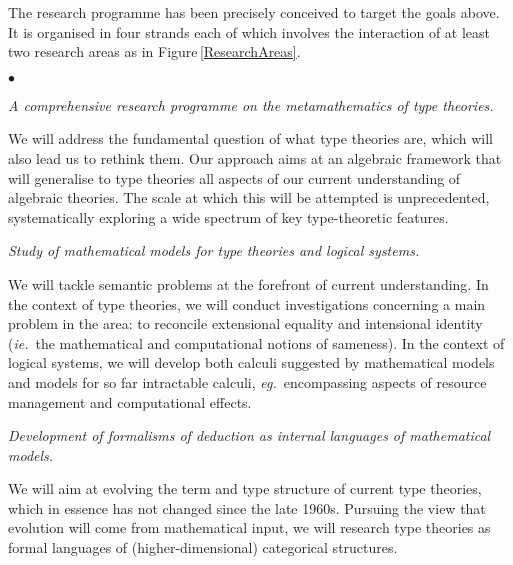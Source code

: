 \documentclass[11pt,twocolumn]{article}
\newenvironment{myitemize}
  {\begin{list}{$\bullet$}
  {\setlength{\topsep}{1pt}
   \setlength{\partopsep}{1pt}
   \setlength{\itemsep}{0pt}
   \setlength{\parsep}{0pt}
   \setlength{\leftmargin}{1em}
   \setlength{\labelwidth}{.5em}}}
  {\end{list}}
\newcommand{\eg}{\emph{eg.}}
\newcommand{\ie}{\emph{ie.}}
\begin{document}
The research programme has been precisely conceived to target the goals
above.  It is organised in four strands %
each of which involves the interaction of at least two research areas as in
Figure\,\ref{ResearchAreas}.
\begin{myitemize}
\item[{\bfseries 1\enspace Foundations:}]\mbox{}\enspace\thinspace 
  \emph{A comprehensive research programme on the metamathematics of type
    theories.}

  \vspace*{1mm}
  We will address the fundamental question of what type theories are, which
  will also lead us to rethink them.  Our approach aims at an algebraic
  framework that will generalise to type theories all aspects of our current
  understanding of algebraic theories.  
  The scale at which this will be
  attempted is unprecedented, systematically exploring a wide spectrum of
  key type-theoretic features.
  \vspace*{1mm}

\item[{\bfseries 2\enspace Models:}]\mbox{}\enspace\thinspace
  \emph{Study of mathematical models for type theories and logical systems.}

  \vspace*{1mm}
  We will tackle semantic problems at the forefront of current understanding.
  In the context of type theories, we will conduct investigations
  concerning a main problem in the area: to reconcile extensional equality
  and intensional identity (\ie~the mathematical and computational notions
  of sameness).  
  In the context of logical systems, we will develop both calculi suggested by
  mathematical models and models for so far intractable calculi,
  \eg~encompassing aspects of resource management and computational effects.  
  \vspace*{1mm}%
  
\item[{\bfseries 3\enspace Calculi:}]\mbox{}\enspace\thinspace
  \emph{Development of formalisms of deduction as internal languages of
    mathematical models.}
  
  \vspace*{1mm}
  We will aim at evolving the term and type structure of current type
  theories, which in essence has not changed since the late 1960s.  Pursuing
  the view that evolution will come from mathematical input, we will
  research type theories as formal languages of (higher-dimensional)
  categorical structures.  
  \vspace*{1mm}


\end{myitemize}
\end{document}
